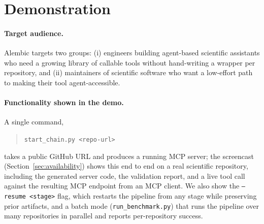 \section{Demonstration}
\label{sec:demo}

\paragraph{Target audience.} Alembic targets two groups: (i) engineers building agent-based scientific assistants who need a growing library of callable tools without hand-writing a wrapper per repository, and (ii) maintainers of scientific software who want a low-effort path to making their tool agent-accessible.

\paragraph{Functionality shown in the demo.} A single command,
\begin{quote}
\small\texttt{start\_chain.py <repo-url>}
\end{quote}
takes a public GitHub URL and produces a running MCP server; the screencast (Section~\ref{sec:availability}) shows this end to end on a real scientific repository, including the generated server code, the validation report, and a live tool call against the resulting MCP endpoint from an MCP client. We also show the \texttt{--resume <stage>} flag, which restarts the pipeline from any stage while preserving prior artifacts, and a batch mode (\texttt{run\_benchmark.py}) that runs the pipeline over many repositories in parallel and reports per-repository success.
